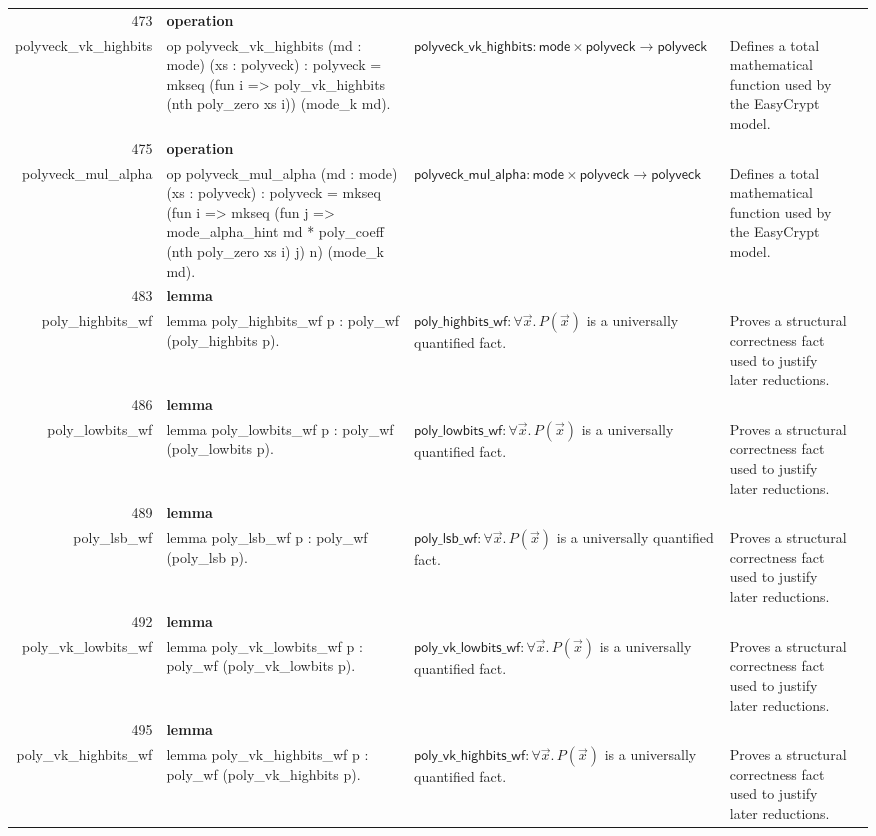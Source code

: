 \documentclass[10pt]{article}
\newcommand{\ec}[1]{\begingroup\ttfamily\scriptsize #1\endgroup}
\begin{document}
\begin{longtable}{r L{0.17\textwidth} L{0.26\textwidth} L{0.27\textwidth} L{0.20\textwidth}}
473 & \textbf{operation}\\\ec{polyveck\_vk\_highbits} & \ec{op polyveck\_vk\_highbits (md : mode) (xs : polyveck) : polyveck = mkseq (fun i => poly\_vk\_highbits (nth poly\_zero xs i)) (mode\_k md).} & \(\mathsf{polyveck\_vk\_highbits} : \mathsf{mode} \times \mathsf{polyveck} \to \mathsf{polyveck}\) & Defines a total mathematical function used by the EasyCrypt model. \\
475 & \textbf{operation}\\\ec{polyveck\_mul\_alpha} & \ec{op polyveck\_mul\_alpha (md : mode) (xs : polyveck) : polyveck = mkseq (fun i => mkseq (fun j => mode\_alpha\_hint md * poly\_coeff (nth poly\_zero xs i) j) n) (mode\_k md).} & \(\mathsf{polyveck\_mul\_alpha} : \mathsf{mode} \times \mathsf{polyveck} \to \mathsf{polyveck}\) & Defines a total mathematical function used by the EasyCrypt model. \\
483 & \textbf{lemma}\\\ec{poly\_highbits\_wf} & \ec{lemma poly\_highbits\_wf p : poly\_wf (poly\_highbits p).} & \(\mathsf{poly\_highbits\_wf} : \forall \vec{x}.\, P(\vec{x})\) is a universally quantified fact. & Proves a structural correctness fact used to justify later reductions. \\
486 & \textbf{lemma}\\\ec{poly\_lowbits\_wf} & \ec{lemma poly\_lowbits\_wf p : poly\_wf (poly\_lowbits p).} & \(\mathsf{poly\_lowbits\_wf} : \forall \vec{x}.\, P(\vec{x})\) is a universally quantified fact. & Proves a structural correctness fact used to justify later reductions. \\
489 & \textbf{lemma}\\\ec{poly\_lsb\_wf} & \ec{lemma poly\_lsb\_wf p : poly\_wf (poly\_lsb p).} & \(\mathsf{poly\_lsb\_wf} : \forall \vec{x}.\, P(\vec{x})\) is a universally quantified fact. & Proves a structural correctness fact used to justify later reductions. \\
492 & \textbf{lemma}\\\ec{poly\_vk\_lowbits\_wf} & \ec{lemma poly\_vk\_lowbits\_wf p : poly\_wf (poly\_vk\_lowbits p).} & \(\mathsf{poly\_vk\_lowbits\_wf} : \forall \vec{x}.\, P(\vec{x})\) is a universally quantified fact. & Proves a structural correctness fact used to justify later reductions. \\
495 & \textbf{lemma}\\\ec{poly\_vk\_highbits\_wf} & \ec{lemma poly\_vk\_highbits\_wf p : poly\_wf (poly\_vk\_highbits p).} & \(\mathsf{poly\_vk\_highbits\_wf} : \forall \vec{x}.\, P(\vec{x})\) is a universally quantified fact. & Proves a structural correctness fact used to justify later reductions. \\

\end{longtable}
\end{document}
